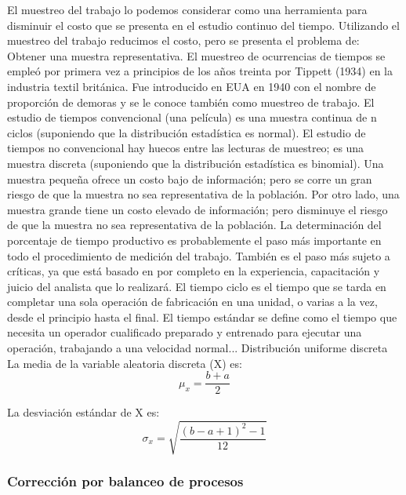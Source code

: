     El muestreo del trabajo lo podemos considerar como una herramienta para disminuir el costo que se presenta en el estudio continuo del tiempo.
    Utilizando el muestreo del trabajo reducimos el costo, pero se presenta el problema de: Obtener una muestra representativa.
    El muestreo de ocurrencias de tiempos se empleó por primera vez a principios de los años treinta por Tippett (1934) en la industria textil británica. Fue introducido en EUA en 1940 con el nombre de proporción de demoras y se le conoce también como muestreo de trabajo.
    El estudio de tiempos convencional (una película) es una muestra continua de n ciclos (suponiendo que la distribución estadística es normal). El estudio de tiempos no convencional hay huecos entre las lecturas de muestreo; es una muestra discreta (suponiendo que la distribución estadística es binomial).
    Una muestra pequeña ofrece un costo bajo de información; pero se corre un gran riesgo de que la muestra no sea representativa de la población.
    Por otro lado, una muestra grande tiene un costo elevado de información; pero disminuye el riesgo de que la muestra no sea representativa de la población.
    La determinación del porcentaje de tiempo productivo es probablemente el paso más importante en todo el procedimiento de medición del trabajo. También es el paso más sujeto a críticas, ya que está basado en por completo en la experiencia, capacitación y juicio del analista que lo realizará.
    El tiempo ciclo es el tiempo que se tarda en completar una sola operación de fabricación en una unidad, o varias a la vez, desde el principio hasta el final.\cite{Tiempociclo}
    El tiempo estándar se define como el tiempo que necesita un operador cualificado preparado y entrenado para ejecutar una operación, trabajando a una velocidad normal.\cite{Tiempoestándar}.\cite{Muestreodetrabajo}.
    Distribución uniforme discreta
     La media de la variable aleatoria discreta (X) es:
        \begin{equation}
             \mu_x=\dfrac{b+a}{2}
        \end{equation}
        
        La desviación estándar de X es:
        \begin{equation}
        \sigma_x=\sqrt{\dfrac{(b-a+1)^2-1}{12}}
        \end{equation}
    \subsubsection{Corrección por balanceo de procesos}
    
